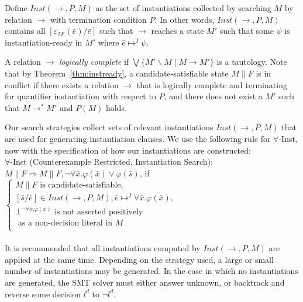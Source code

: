 \documentclass{llncs}
\begin{document}
Define $Inst( \rightarrow, P, M )$ as the set of instantiations collected by searching $M$ by relation $\rightarrow$ with termination condition $P$.
In other words, $Inst( \rightarrow, P, M )$ contains all $[\varepsilon_{M'}(\bar{e})/\bar{e}]$ such that $\rightarrow$ reaches a state $M'$ such that some $\psi$ is instantiation-ready in $M'$ where $\bar{e} \mapsto^I \psi$.

A relation $\rightarrow$ \emph{logically complete} if $\bigvee \{ M' \backslash M \mid M \rightarrow M' \}$ is a tautology.
Note that by Theorem~\ref{thm:instready}, a candidate-satisfiable state $M \parallel F$ is in conflict if there exists a relation $\rightarrow$ that is logically complete and terminating for quantifier instantiation with respect to $P$, and there does not exist a $M'$ such that $M \rightarrow^\ast M'$ and $P(M)$ holds.

Our search strategies collect sets of relevant instantiations $Inst( \rightarrow, P, M )$ that are used for generating instantiation clauses.
We use the following rule for $\forall$-Inst, now with the specification of how our instantiations are constructed: \\

\noindent $\forall$-Inst (Counterexample Restricted, Instantiation Search): \\

$M \parallel F \Longrightarrow M \parallel F, \neg \forall \bar{x}. \varphi( \bar{ x } ) \vee \varphi( \bar{ s } )$, if   
$\begin{cases}
  M \parallel F \text{ is candidate-satisfiable}, \\
  [\bar{ s }/\bar{e}] \in Inst( \rightarrow, P, M ), \bar{e} \mapsto^I \forall \bar{x}. \varphi( \bar{ x } ), \\
  \bot^{\neg \forall \bar{x}. \varphi( \bar{ x } )} \text{ is not asserted positively }\\
  \text{ \ \ \ as a non-decision literal in $M$ } \\    
\end{cases}$ \\

\ \\

It is recommended that all instantiations computed by $Inst( \rightarrow, P, M )$ are applied at the same time.
Depending on the strategy used, a large or small number of instantiations may be generated.
In the case in which no instantiations are generated, the SMT solver must either answer unknown, or backtrack and reverse some decision $l^d$ to $\neg l^d$.
\end{document}
